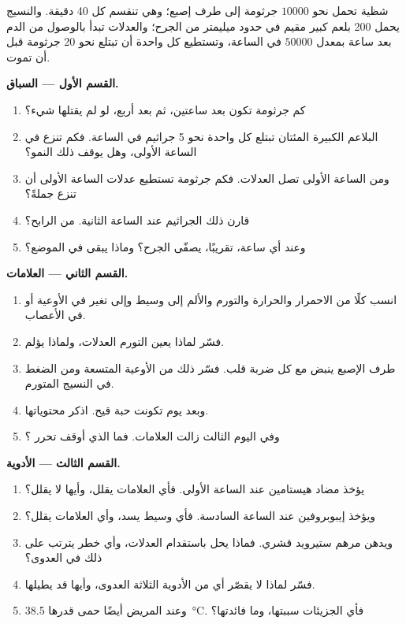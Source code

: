 \begin{problem}
\label{pb:g12:innate-immunity:1}
شظية تحمل نحو $\num{10000}$ جرثومة إلى طرف إصبع؛ وهي تنقسم كل 40
دقيقة. والنسيج يحمل 200 بلعم كبير مقيم في حدود ميليمتر من الجرح؛
والعدلات تبدأ بالوصول من الدم بعد ساعة بمعدل $\num{50000}$ في الساعة،
وتستطيع كل واحدة أن تبتلع نحو 20 جرثومة قبل أن تموت.

\medskip
\noindent\textbf{القسم الأول --- السباق.}
\begin{enumerate}
  \item كم جرثومة تكون بعد ساعتين، ثم بعد أربع، لو لم يقتلها شيء؟
  \item البلاعم الكبيرة المئتان تبتلع كل واحدة نحو 5 جراثيم في الساعة.
        فكم تنزع في الساعة الأولى، وهل يوقف ذلك النمو؟
  \item ومن الساعة الأولى تصل العدلات. فكم جرثومة تستطيع عدلات الساعة
        الأولى أن تنزع جملةً؟
  \item قارن ذلك  الجراثيم عند الساعة الثانية. من الرابح؟
  \item وعند أي ساعة، تقريبًا، يصفّى الجرح؟ وماذا يبقى في الموضع؟
\end{enumerate}

\medskip
\noindent\textbf{القسم الثاني --- العلامات.}
\begin{enumerate}[resume]
  \item انسب كلًا من الاحمرار والحرارة والتورم والألم إلى وسيط وإلى
        تغير في الأوعية أو في الأعصاب.
  \item فسّر لماذا يعين التورم العدلات، ولماذا يؤلم.
  \item طرف الإصبع ينبض مع كل ضربة قلب. فسّر ذلك من الأوعية المتسعة
        ومن الضغط في النسيج المتورم.
  \item وبعد يوم تكونت حبة قيح. اذكر محتوياتها.
  \item وفي اليوم الثالث زالت العلامات. فما الذي أوقف تحرر ؟
\end{enumerate}

\medskip
\noindent\textbf{القسم الثالث --- الأدوية.}
\begin{enumerate}[resume]
  \item يؤخذ مضاد هيستامين عند الساعة الأولى. فأي العلامات يقلل، وأيها
        لا يقلل؟
  \item ويؤخذ إيبوبروفين عند الساعة السادسة. فأي وسيط يسد، وأي
        العلامات يقلل؟
  \item ويدهن مرهم ستيرويد قشري. فماذا يحل باستقدام العدلات، وأي خطر
        يترتب على ذلك في العدوى؟
  \item فسّر لماذا لا يقصّر أي من الأدوية الثلاثة العدوى، وأيها قد
        يطيلها.
  \item وعند المريض أيضًا حمى قدرها \qty{38.5}{\celsius}. فأي الجزيئات
        سببتها، وما فائدتها؟
\end{enumerate}


\end{problem}
